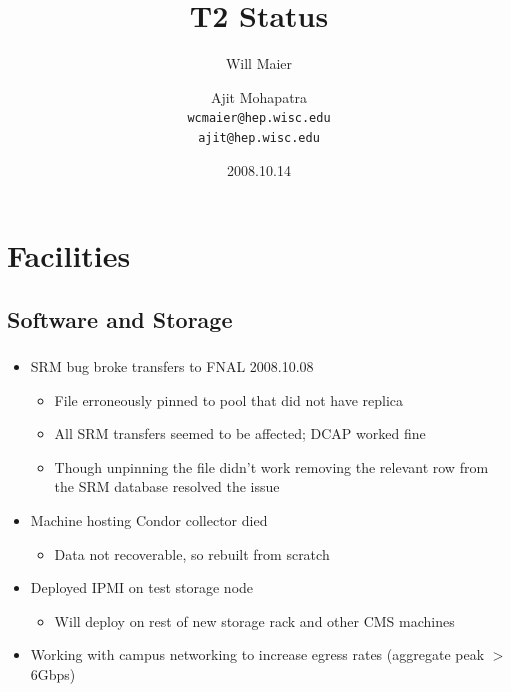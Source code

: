 \documentclass{beamer}
\title{T2 Status}
\author[Maier, Mohapatra]{
    Will Maier \and Ajit Mohapatra\\ 
    {\tt wcmaier@hep.wisc.edu}\\
    {\tt ajit@hep.wisc.edu}}
\institute[Wisconsin]{University of Wisconsin - High Energy Physics}
\date{2008.10.14}
\begin{document}
\begin{frame}
    \titlepage
\end{frame}


\section{Facilities}
\subsection{Software and Storage}
\begin{frame}
\frametitle{}
\begin{itemize}
    \item SRM bug broke transfers to FNAL 2008.10.08
    \begin{itemize}
        \item File erroneously pinned to pool that did not have replica
        \item All SRM transfers seemed to be affected; DCAP worked fine
        \item Though unpinning the file didn't work removing the relevant row from the SRM database resolved the issue
    \end{itemize}
    \item Machine hosting Condor collector died
    \begin{itemize}
        \item Data not recoverable, so rebuilt from scratch
    \end{itemize}
    \item Deployed IPMI on test storage node
    \begin{itemize}
        \item Will deploy on rest of new storage rack and other CMS machines
    \end{itemize}
    \item Working with campus networking to increase egress rates (aggregate peak $>$ 6Gbps)
\end{itemize}
\end{frame}
\end{document}
